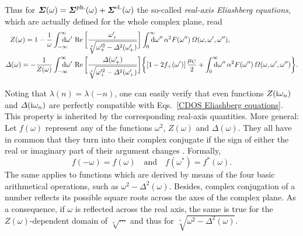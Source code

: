 Thus for $\boldsymbol {\varSigma}(\omega) = \boldsymbol {\varSigma} \sp{\text{ph.}}(\omega) + \boldsymbol {\varSigma}
\sp{\text{el.}}(\omega)$ the so-called \emph{real-axis Eliashberg equations}, which
are actually defined for the whole complex plane, read
%
\begin{align*}
    Z(\omega) = 1 - \frac 1 \omega
    &\int \from{-\infty} \till \infty \D \omega' \,
    \Re \bigg[
        \frac{\omega'_+}{\sqrt[*]{\omega'^2_+ - \Delta^2(\omega'_+)}}
    \bigg] \int \from 0 \till \infty \D \omega'' \, \alpha^2 F(\omega'') \,
    \Omega(\omega, \omega', \omega''),
    \\
    \Delta(\omega) = -\frac 1 {Z(\omega)}
    &\int \from{-\infty} \till \infty \D \omega' \,
    \Re \bigg[
        \frac{\Delta(\omega'_+)}{\sqrt[*]{\omega'^2_+ - \Delta^2(\omega'_+)}}
    \bigg]
    \bigg \{
        [1 - 2 f_+(\omega')] \, \frac {\mu \sub C} 2
        + \int \from 0 \till \infty \D \omega'' \, \alpha^2 F(\omega'') \,
        \Omega(\omega, \omega', \omega'')
    \bigg \}.
\end{align*}

Noting that $\lambda(n) = \lambda(-n)$, one can easily verify that even
functions $Z(\mathrm i \omega_n)$ and $\varDelta(\mathrm i \omega_n)$ are perfectly compatible
with Eqs.~\ref{CDOS Eliashberg equations}. This property is inherited by the
corresponding real-axis quantities. More general: Let $f(\omega)$ represent any
of the functions $\omega^2$, $Z(\omega)$ and $\Delta(\omega)$. They all have in
common that they turn into their complex conjugate if the sign of either the
real or imaginary part of their argument changes
\cite[Eq.~A5]{AmbegaokarTewordt64}. Formally,
%
\begin{equation} \label{frequency symmetries}
    f(-\omega) = f(\omega) \quad \text{and} \quad f(\omega^*) = f^*(\omega).
\end{equation}
%
The same applies to functions which are derived by means of the four basic
arithmetical operations, such as $\omega^2 - \Delta^2(\omega)$. Besides, complex
conjugation of a number reflects its possible square roots across the axes of
the complex plane. As a consequence, if $\omega$ is reflected across the real
axis, the same is true for the $Z(\omega)$-dependent domain of $\sqrt[*] \cdots$
and thus for $\sqrt[*]{\omega^2 - \Delta^2(\omega)}$.

